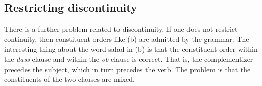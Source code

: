 \subsection{Restricting discontinuity}
\label{sec-restricting-discont}

There is a further problem related to discontinuity. If one does not restrict continuity, then
constituent orders like (b) are admitted by the grammar:
\eal
{}
\zl
The interesting thing about the word salad in (b) is that the constituent order within the
\emph{dass} clause and within the \emph{ob} clause is correct. That is, the complementizer precedes
the subject, which in turn precedes the verb. The problem is that the constituents of the two
clauses are mixed. 

